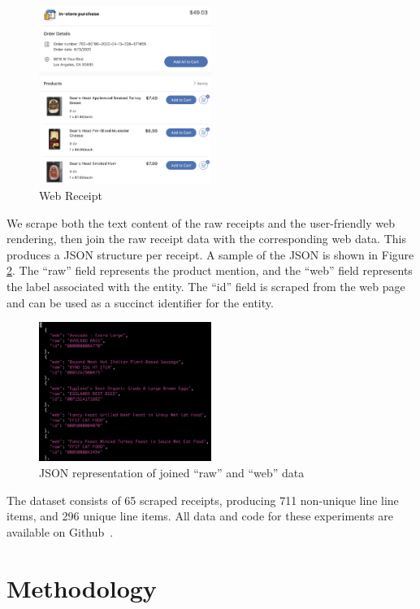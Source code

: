 \documentclass[11pt,a4paper]{article}
\begin{document}
\begin{figure}[h]
  \centering
\includegraphics[width=0.5\textwidth]{web_receipt}
\caption{Web Receipt}
\label{fig:web}
\end{figure}

We scrape both the text content of the raw receipts and the
user-friendly web rendering, then join the raw receipt data with the
corresponding web data.  This produces a JSON structure per receipt.
A sample of the JSON is shown in Figure \ref{fig:json}.  The ``raw''
field represents the product mention, and the ``web'' field represents
the label associated with the entity.  The ``id'' field is scraped from
the web page and can be used as a succinct identifier for the entity. 

\begin{figure}[h]
  \centering
\includegraphics[width=0.5\textwidth]{json}
\caption{JSON representation of joined ``raw'' and ``web'' data}
\label{fig:json}
\end{figure}

The dataset consists of 65 scraped receipts, producing 711 non-unique line
line items, and 296 unique line items.  All data and code for these
experiments are available on Github~\cite{github}.


\section{Methodology}
\end{document}
